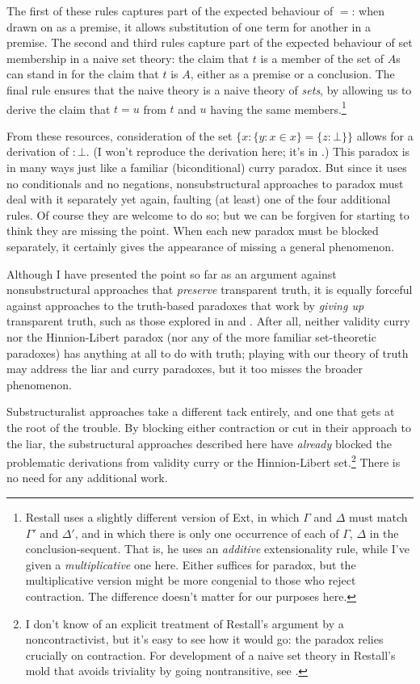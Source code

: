 \documentclass{ergoclass}
\newcommand{\sqq}[2]{\ensuremath{#1  \mathrel{:}  #2}}
\newcommand{\set}[2]{\ensuremath{\{#1 : #2\}}}
\newcommand{\D}{\Delta}
\newcommand{\G}{\Gamma}
\renewcommand{\cite}{\citet}						%
\begin{document}
The first of these rules captures part of the expected behaviour of $=$: when drawn on as a premise, it allows substitution of one term for another in a premise. The second and third rules capture part of the expected behaviour of set membership in a naive set theory: the claim that $t$ is a member of the set of $A$s can stand in for the claim that $t$ is $A$, either as a premise or a conclusion. The final rule ensures that the naive theory is a naive theory of {\em sets}, by allowing us to derive the claim that $t = u$ from $t$ and $u$ having the same members.\footnote{Restall uses a slightly different version of Ext, in which $\G$ and $\D$ must match $\G'$ and $\D'$, and in which there is only one occurrence of each of $\G$, $\D$ in the conclusion-sequent. That is, he uses an {\em additive} extensionality rule, while I've given a {\em multiplicative} one here. Either suffices for paradox, but the multiplicative version might be more congenial to those who reject contraction. The difference doesn't matter for our purposes here.}

From these resources, consideration of the set $\set{x}{\set{y}{x \in x} = \set{z}{\bot}}$ allows for a derivation of $\sqq{}{\bot}$. (I won't reproduce the derivation here; it's in \citealt{restall:adnct}.) This paradox is in many ways just like a familiar (biconditional) curry paradox. But since it uses no conditionals and no negations, nonsubstructural approaches to paradox must deal with it separately yet again, faulting (at least) one of the four additional rules. Of course they are welcome to do so; but we can be forgiven for starting to think they are missing the point. When each new paradox must be blocked separately, it certainly gives the appearance of missing a general phenomenon.

Although I have presented the point so far as an argument against nonsubstructural approaches that {\em preserve} transparent truth, it is equally forceful against approaches to the truth-based paradoxes that work by {\em giving up} transparent truth, such as those explored in \cite{halbach:att, maudlin:tp} and \cite{scharp:rt}. After all, neither validity curry nor the Hinnion-Libert paradox (nor any of the more familiar set-theoretic paradoxes) has anything at all to do with truth; playing with our theory of truth may address the liar and curry paradoxes, but it too misses the broader phenomenon. 

Substructuralist approaches take a different tack entirely, and one that gets at the root of the trouble. By blocking either contraction or cut in their approach to the liar, the substructural approaches described here have {\em already} blocked the problematic derivations from validity curry or the Hinnion-Libert set.\footnote{I don't know of an explicit treatment of Restall's argument by a noncontractivist, but it's easy to see how it would go: the paradox relies crucially on contraction. For development of a naive set theory in Restall's mold that avoids triviality by going nontransitive, see \cite{ripley:nstntl}.} There is no need for any additional work.
\end{document}
